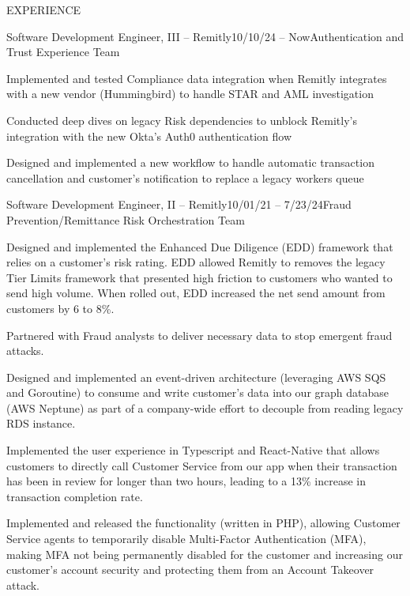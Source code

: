 \documentclass{resume} %
\begin{document}
\begin{rSection}{EXPERIENCE}

    \begin{rSubsection}{Software Development Engineer, III -- Remitly}{10/10/24 -- Now}{Authentication and Trust Experience Team}{}
        \item Implemented and tested Compliance data  integration when Remitly integrates with a new vendor (Hummingbird) to handle STAR and AML investigation
        \item Conducted deep dives on legacy Risk dependencies to unblock Remitly's integration with the new Okta's Auth0 authentication flow
        \item Designed and implemented a new workflow to handle automatic transaction cancellation and customer's notification to replace a legacy workers queue
    \end{rSubsection}


    \begin{rSubsection}{Software Development Engineer, II -- Remitly}{10/01/21 -- 7/23/24}{Fraud Prevention/Remittance Risk Orchestration Team}{}
        \item Designed and implemented the Enhanced Due Diligence (EDD) framework that relies on a customer’s risk rating. EDD allowed Remitly to removes the legacy Tier Limits framework that presented high friction to customers who wanted to send high volume. When rolled out, EDD increased the net send amount from customers by 6 to 8\%.
        \item Partnered with Fraud analysts to deliver necessary data to stop emergent fraud attacks.
        \item Designed and implemented an event-driven architecture (leveraging AWS SQS and Goroutine) to consume and write customer’s data into our graph database (AWS Neptune) as part of a company-wide effort to decouple from reading legacy RDS instance.
        \item Implemented the user experience in Typescript and React-Native that allows customers to directly call Customer Service from our app when their transaction has been in review for longer than two hours, leading to a 13\% increase in transaction completion rate.
        \item Implemented and released the functionality (written in PHP), allowing Customer Service agents to temporarily disable Multi-Factor Authentication (MFA), making MFA not being permanently disabled for the customer and increasing our customer’s account security and protecting them from an Account Takeover attack.
    \end{rSubsection}
    

\end{rSection}
\end{document}
